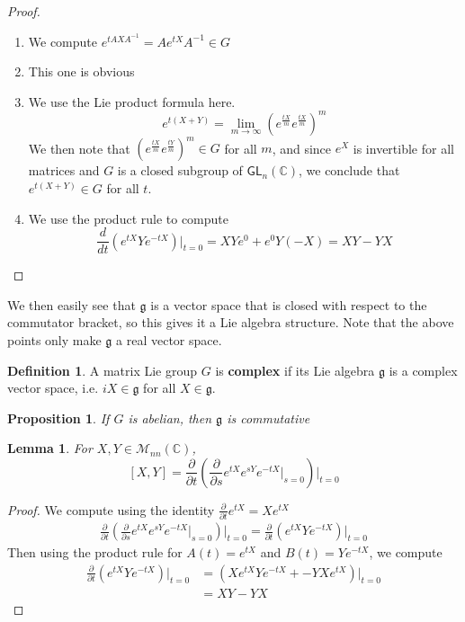 \documentclass[psamsfonts]{amsart}
\newtheorem{prop}[thm]{Proposition}
\newtheorem{lem}[thm]{Lemma}
\theoremstyle{definition}
\newtheorem{defn}[thm]{Definition}
\theoremstyle{remark}
\newcommand{\C}{\mathbb{C}}
\newcommand{\M}{\mathcal{M}}
\newcommand{\GL}{\mathsf{GL}}
\newcommand{\g}{\mathfrak{g}}
\newcommand{\inv}{^{-1}}
\newcommand{\bra}[2]{ \left[ #1, #2 \right] }
\newcommand{\bd}{\partial}
\begin{document}
\begin{proof}
$ $\\
\begin{enumerate}
\item We compute $e^{tAXA\inv} = Ae^{tX}A\inv \in G$
\item This one is obvious
\item We use the Lie product formula here. 
$$e^{t(X+Y)} = \lim_{m \to \infty} \left( e^{\frac{tX}{m}}e^{\frac{tX}{m}} \right)^m $$
We then note that $\left( e^{\frac{tX}{m}}e^{\frac{tY}{m}}  \right)^m \in G$ for all $m$, and since $e^X$ is invertible for all matrices and $G$ is a closed subgroup of $\GL_n(\C)$, we conclude that $e^{t(X+Y)} \in G$ for all $t$.
\item We use the product rule to compute
$$\frac{d}{dt}\left( e^{tX}Ye^{-tX} \right)\bigg\vert_{t = 0} = XYe^0 + e^0Y(-X) = XY-YX $$
\end{enumerate}
\end{proof}

We then easily see that $\g$ is a vector space that is closed with respect to the commutator bracket, so this gives it a Lie algebra structure. Note that the above points only make $\g$ a real vector space.

\begin{defn}
A matrix Lie group $G$ is \textbf{complex} if its Lie algebra $\g$ is a complex vector space, i.e. $iX \in \g$ for all $X \in \g$.
\end{defn}

\begin{prop}
If $G$ is abelian, then $\g$ is commutative
\end{prop}

\begin{lem}
For $X,Y \in \M_{nn}(\C)$,
$$\bra{X}{Y} = \frac{\bd}{\bd t}\left( \frac{\bd}{\bd s} e^{tX}e^{sY}e^{-tX}\bigg\vert_{s = 0} \right)\bigg\vert_{t = 0} $$
\end{lem}

\begin{proof}
We compute using the identity $\frac{\bd}{\bd t}e^{tX} = Xe^{tX}$
\begin{align*}
\frac{\bd}{\bd t}\left( \frac{\bd}{\bd s} e^{tX}e^{sY}e^{-tX}\bigg\vert_{s = 0} \right)\bigg\vert_{t = 0} = \frac{\bd}{\bd t}\left( e^{tX}Ye^{-tX}  \right)\bigg\vert_{t = 0}
\end{align*}
Then using the product rule for $A(t) = e^{tX}$ and $B(t) = Ye^{-tX}$, we compute
\begin{align*}
\frac{\bd}{\bd t}\left( e^{tX}Ye^{-tX}  \right)\bigg\vert_{t = 0} &=\left( Xe^{tX}Ye^{-tX} + -YXe^{tX} \right)\bigg\vert_{t = 0} \\
&= XY - YX
\end{align*}
\end{proof}
\end{document}
